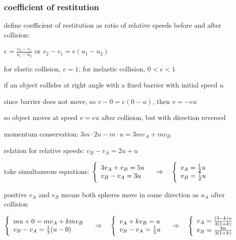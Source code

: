 \subsubsection{coefficient of restitution}

define coefficient of restitution as ratio of relative speeds before and after collision:
\begin{center}
$\boxed{e = \frac{v_2 - v_1}{u_1 - u_2}}$ or $\boxed{v_2 - v_1 = e(u_1 - u_2)}$
\end{center}

for elastic collision, $e = 1$; for inelastic collision, $0 < e < 1$

\vspace*{\baselineskip}

if an object collides at right angle with a fixed barrier with initial speed $u$

since barrier does not move, so $v-0 = e(0-u)$, then $v=-eu$

so object moves at speed $v=eu$ after collision, but with direction reversed




momentum conservation: $3m\cdot 2u - m \cdot u = 3m v_A + m v_B$

relation for relative speeds: $v_B - v_A = 2u + u$

take simultaneous equations: $\Bigg\{\begin{array}{l}
3v_A + v_B = 5u \\
v_B - v_A = 3u
\end{array} \quad \Rightarrow \quad 
\Bigg\{\begin{array}{l}
v_A = \frac{1}{2}u \\
v_B = \frac{7}{2}u
\end{array}$

positive $v_A$ and $v_B$ means both spheres move in same direction as $u_A$ after collision \eoe


{
	
\centering

$\Bigg\{\begin{array}{l}
mu + 0 = m v_A + km v_B \\
v_B - v_A = \frac{1}{3}(u-0)
\end{array} \quad \Rightarrow \quad
\Bigg\{\begin{array}{l}
	v_A + k v_B = u\\
	v_B - v_A = \frac{1}{3}u
\end{array} \quad \Rightarrow \quad 
\Bigg\{\begin{array}{l}
v_A = \frac{(3-k)u}{3(1+k)} \\
v_B = \frac{4u}{3(1+k)}
\end{array}$

}

